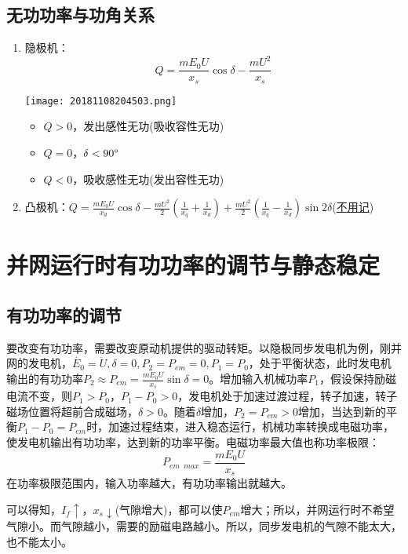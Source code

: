 \documentclass[blue]{elegantnote}
\begin{document}
\subsection{无功功率与功角关系}
\begin{enumerate}
	\item 隐极机：$$Q=\frac{mE_0U}{x_s}\cos\delta-\frac{mU^2}{x_s}$$
	\begin{center}  
		\texttt{[image: 20181108204503.png]}
	\end{center}  
	\begin{itemize}
		\item $Q>0$，发出感性无功(吸收容性无功)
		\item $Q=0$，$\delta<90\degree$
		\item $Q<0$，吸收感性无功(发出容性无功)
	\end{itemize}
	\item 凸极机：$Q=\frac{mE_0U}{x_d}\cos\delta-\frac{mU^2}{2}(\frac{1}{x_q}+\frac{1}{x_d})+\frac{mU^2}{2}(\frac{1}{x_q}-\frac{1}{x_d})\sin2\delta$({\underline{不用记}})
\end{enumerate}
\section{并网运行时有功功率的调节与静态稳定}
\subsection{有功功率的调节}
{\color{thid}要改变有功功率，需要改变原动机提供的驱动转矩。}以隐极同步发电机为例，刚并网的发电机，$\dot{E_0}=\dot{U},\delta=0,P_2=P_{em}=0,P_1=P_0$，处于平衡状态，此时发电机输出的有功功率$P_2\approx P_{em}=\frac{mE_0U}{x_s}\sin\delta=0$。增加输入机械功率$P_1$，假设保持励磁电流不变，则$P_1>P_0$，$P_1-P_0>0$，发电机处于加速过渡过程，转子加速，转子磁场位置将超前合成磁场，$\delta>0$。随着$\delta$增加，$P_2=P_{em}>0$增加，当达到新的平衡$P_1-P_0=P_{em}$时，加速过程结束，进入稳态运行，机械功率转换成电磁功率，使发电机输出有功功率，达到新的功率平衡。电磁功率最大值也称功率极限：
$$P_{em\phantom{a}max}=\frac{mE_0U}{x_s}$$
在功率极限范围内，输入功率越大，有功功率输出就越大。
\begin{note}
	可以得知，$I_f\uparrow$，$x_s\downarrow$(气隙增大)，都可以使$P_{em}$增大；所以，并网运行时不希望气隙小。而气隙越小，需要的励磁电路越小。所以，同步发电机的气隙不能太大，也不能太小。
\end{note}
\end{document}
